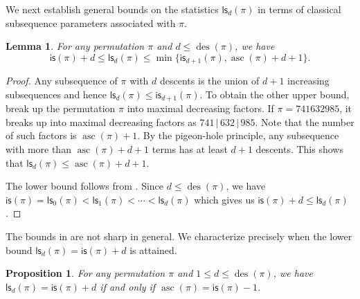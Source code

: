 \documentclass[12pt]{article}
\newcommand{\is}{\mathsf{is}}
\newcommand{\ls}{\mathsf{ls}}
\newcommand{\asc}{\operatorname{asc}}
\newcommand{\des}{\operatorname{des}}
\newtheorem{lemma}[theorem]{Lemma}
\newtheorem{proposition}[theorem]{Proposition}
\theoremstyle{definition}
\begin{document}
We next establish general bounds on the statistics $\ls_d(\pi)$ in terms of classical subsequence parameters associated with $\pi$.

\begin{lemma}\label{lsdbound}
    For any permutation $\pi$ and $d \leq \des(\pi)$, we have
    \begin{equation*}
        \is(\pi) + d \leq \ls_d(\pi) \leq \operatorname{min}\{\is_{d + 1}(\pi), \asc(\pi) + d + 1\}.
    \end{equation*}
\end{lemma}

\begin{proof}
    Any subsequence of $\pi$ with $d$ descents is the union of $d + 1$ increasing subsequences and hence $\ls_d(\pi) \leq \is_{d + 1}(\pi)$. 
    To obtain the other upper bound, break up the permutation $\pi$ into maximal decreasing factors. 
    If $\pi = 741632985$, it breaks up into maximal decreasing factors as $741\,|\,632\,|\,985$. 
    Note that the number of such factors is $\asc(\pi) + 1$. 
    By the pigeon-hole principle, any subsequence with more than $\asc(\pi) + d + 1$ terms has at least $d + 1$ descents. 
    This shows that $\ls_d(\pi) \leq \asc(\pi) + d + 1$.
    
    The lower bound follows from . 
    Since $d \leq \des(\pi)$, we have $\is(\pi) = \ls_0(\pi) < \ls_1(\pi) < \cdots < \ls_d(\pi)$ which gives us $\is(\pi) + d \leq \ls_d(\pi)$.
\end{proof}

The bounds in  are not sharp in general. We characterize precisely when the lower bound $\ls_d(\pi) = \is(\pi) + d$ is attained.

\begin{proposition}\label{gs=isplus1}
    For any permutation $\pi$ and $1 \leq d \leq \des(\pi)$, we have $\ls_d(\pi) = \is(\pi) + d$ if and only if $\asc(\pi) = \is(\pi) - 1$.
\end{proposition}
\end{document}
